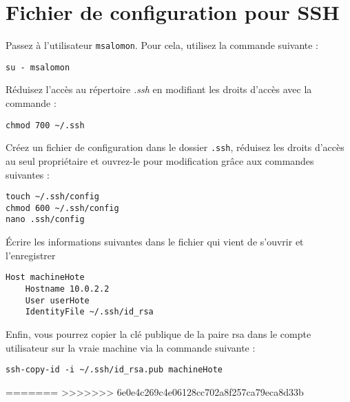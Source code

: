 \section{Fichier de configuration pour SSH}

Passez à l'utilisateur \texttt{msalomon}. Pour cela, utilisez la commande suivante :

\begin{lstlisting}
su - msalomon
\end{lstlisting}

Réduisez l'accès au répertoire \textit{.ssh} en modifiant les droits d'accès avec la commande :

\begin{lstlisting}
chmod 700 ~/.ssh
\end{lstlisting}

Créez un fichier de configuration dans le dossier \texttt{.ssh}, réduisez les droits d'accès au seul propriétaire et ouvrez-le pour modification grâce aux commandes suivantes :
\begin{lstlisting}
touch ~/.ssh/config
chmod 600 ~/.ssh/config
nano .ssh/config
\end{lstlisting}

Écrire les informations suivantes dans le fichier qui vient de s'ouvrir et l'enregistrer

\begin{lstlisting}[style=tf]
Host machineHote
	Hostname 10.0.2.2
	User userHote
	IdentityFile ~/.ssh/id_rsa
\end{lstlisting}

Enfin, vous pourrez copier la clé publique de la paire rsa dans le compte utilisateur sur la vraie machine via la commande suivante :

\begin{lstlisting}
ssh-copy-id -i ~/.ssh/id_rsa.pub machineHote
\end{lstlisting}

=======
>>>>>>> 6e0e4c269c4e06128cc702a8f257ca79eca8d33b
